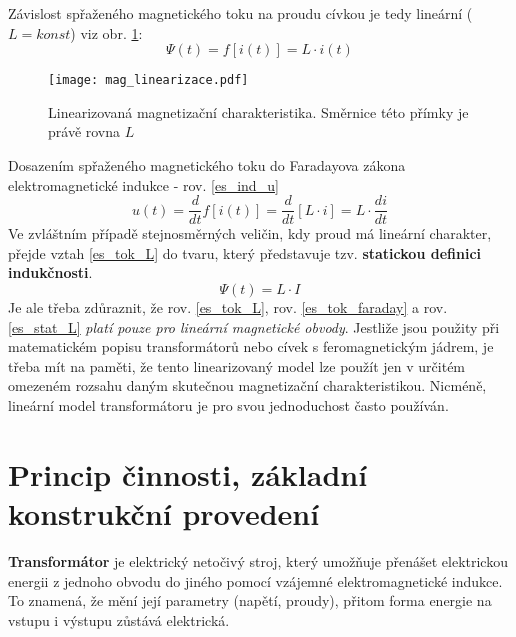     Závislost spřaženého magnetického toku na proudu cívkou je tedy lineární ($L=konst$) viz obr.
    \ref{figure:mag_lin}:
    \begin{equation}\label{es_tok_L}
      \Psi(t)=f[i(t)] = L \cdot i(t)
    \end{equation}
    
    \begin{figure}
      \centering
      \texttt{[image: mag\_linearizace.pdf]}
      \caption{Linearizovaná magnetizační charakteristika. Směrnice této přímky je právě rovna $L$}
      \label{figure:mag_lin}
    \end{figure}
    Dosazením spřaženého magnetického toku do Faradayova zákona elektromagnetické indukce - rov.
    \ref{es_ind_u}
    \begin{equation}\label{es_tok_faraday}
        u(t)=\frac{d}{dt}f[i(t)]=\frac{d}{dt}[L\cdot i]=L\cdot\frac{di}{dt}
    \end{equation}
    Ve zvláštním případě stejnosměrných veličin, kdy proud má lineární charakter, přejde vztah
    \ref{es_tok_L} do tvaru, který představuje tzv. \textbf{statickou definici indukčnosti}.
    \begin{equation}\label{es_stat_L}
      \Psi(t)= L \cdot I
    \end{equation}
    Je ale třeba zdůraznit, že rov. \ref{es_tok_L}, rov. \ref{es_tok_faraday} a rov. \ref{es_stat_L} 
    \emph{platí pouze pro lineární magnetické obvody}. Jestliže jsou použity při matematickém popisu 
    transformátorů nebo cívek s feromagnetickým jádrem, je třeba mít na paměti, že tento linearizovaný model 
    lze použít jen v určitém omezeném rozsahu daným skutečnou magnetizační charakteristikou. Nicméně, 
    lineární model transformátoru je pro svou jednoduchost často používán.
    
  \section{Princip činnosti, základní konstrukční provedení}
    \begin{definition}
      \textbf{Transformátor} je elektrický netočivý stroj, který umožňuje pře\-nášet elektrickou energii z 
      jednoho obvodu do jiného pomocí vzá\-jemné elektromagnetické indukce. To znamená, že mění její 
      parametry (napětí, proudy), přitom forma energie na vstupu i výstupu zůstává elektrická.
    \end{definition}

